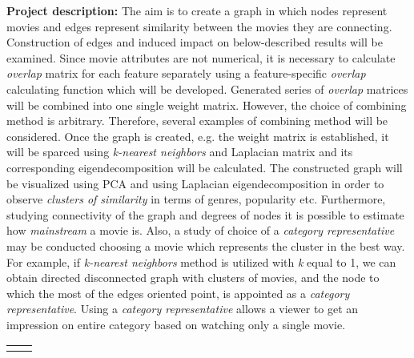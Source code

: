 \documentclass[12pt,a4paper]{report}
\let\openright=\clearpage
\begin{document}
\vspace{5mm}
\noindent \textbf{Project description:}
The aim is to create a graph in which nodes represent movies and edges represent similarity between the movies they are connecting. Construction of edges and induced impact on below-described results will be examined. Since movie attributes are not numerical, it is necessary to calculate \textit{overlap} matrix for each feature separately using a feature-specific \textit{overlap} calculating function which will be developed. Generated series of \textit{overlap} matrices will be combined into one single weight matrix. However, the choice of combining method is arbitrary. Therefore, several examples of combining method will be considered. Once the graph is created, e.g. the weight matrix is established, it will be sparced using \textit{k-nearest neighbors} and Laplacian matrix and its corresponding eigendecomposition will be calculated. The constructed graph will be visualized using PCA and using Laplacian eigendecomposition in order to observe \textit{clusters of similarity} in terms of genres, popularity etc. Furthermore, studying connectivity of the graph and degrees of nodes it is possible to estimate how \textit{mainstream} a movie is. Also, a study of choice of a \textit{category representative} may be conducted choosing a movie which represents the cluster in the best way. For example, if \textit{k-nearest neighbors} method is utilized with \textit{k} equal to 1, we can obtain directed disconnected graph with clusters of movies, and the node to which the most of the edges oriented point, is appointed as a \textit{category representative}. Using a \textit{category representative} allows a viewer to get an impression on entire category based on watching only a single movie. 




\begin{tabular}{rl}

\noalign{\vspace{2mm}}
\noalign{\vspace{2mm}}

\end{tabular}







\newpage


\newpage

\openright

\pagestyle{fancy}
\fancyhead{}
\fancyfoot{}

\fancyhead[LE,RO]{ \rightmark}

\fancyfoot[C]{\thepage}

\setcounter{page}{1}



\newpage

\newpage

\openright
\end{document}
